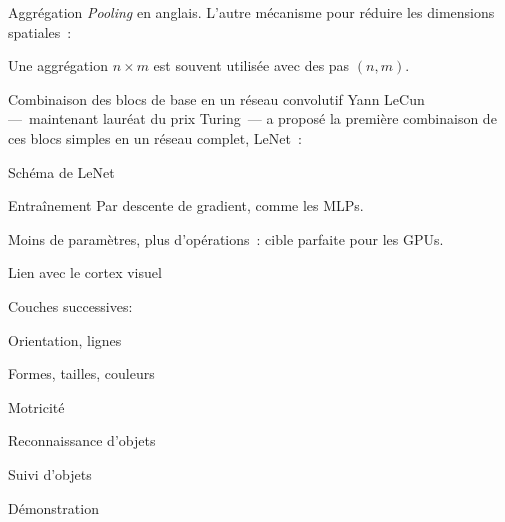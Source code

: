\begin{frame}{Aggrégation}
  \textit{Pooling} en anglais. L'autre mécanisme pour réduire les dimensions spatiales~:


  Une aggrégation $n \times m$ est souvent utilisée avec des pas $(n, m)$.
\end{frame}

\begin{frame}{Combinaison des blocs de base en un réseau convolutif}
  Yann LeCun ---~maintenant lauréat du prix Turing~--- a proposé la première combinaison de ces blocs simples en un réseau complet, LeNet~:

\end{frame}

\begin{frame}{Schéma de LeNet}
\end{frame}

\begin{frame}{Entraînement}
  Par descente de gradient, comme les MLPs.

  Moins de paramètres, plus d'opérations~: cible parfaite pour les GPUs.

\end{frame}

\begin{frame}{Lien avec le cortex visuel}
  \begin{minipage}[l]{0.50\linewidth}
  \end{minipage}\hfill
  \begin{minipage}[l]{0.49\linewidth}
    Couches successives:
    \begin{description}[<+(1)->]
    \item[V1] Orientation, lignes
    \item[V2] Formes, tailles, couleurs
    \item[V3] Motricité
    \item[V4] Reconnaissance d'objets
    \item[V5] Suivi d'objets
    \end{description}
  \end{minipage}\hfill
\end{frame}

\begin{frame}{Démonstration}
\end{frame}
